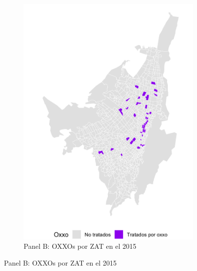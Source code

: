 \documentclass{article}
\begin{document}
\begin{figure} [H]
\begin{subfigure}[b]{0.4\textwidth}
        \includegraphics[width=\linewidth]{figs_oxxo_maps/mapa_oxxos_binary_2015.png}
        \caption{Panel B: OXXOs por ZAT en el 2015}
        \label{fig:panelB}
    \end{subfigure}
    
    \vspace{0.5cm}
    

\end{figure}
\end{document}
